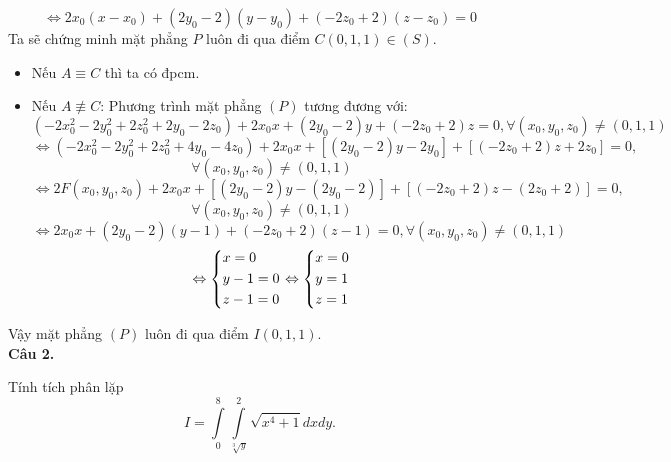 \documentclass[12pt,a4paper]{article}
\begin{document}
\begin{equation}
 \Leftrightarrow 2{x_0}\left( {x - {x_0}} \right) + \left( {2{y_0} - 2} \right)\left( {y - {y_0}} \right) + \left( { - 2{z_0} + 2} \right)\left( {z - {z_0}} \right) = 0
\end{equation} \label{ptmp}
Ta sẽ chứng minh mặt phẳng \(P\) luôn đi qua điểm \(C\left( {0,1,1} \right) \in \left( S \right).\) 
\begin{itemize}
\item Nếu \(A \equiv C\) thì ta có đpcm.
\item Nếu \(A \not \equiv C\):
Phương trình mặt phẳng \(\left( P \right)\) tương đương với:
\[\left( { - 2x_0^2 - 2y_0^2 + 2z_0^2 + 2{y_0} - 2{z_0}} \right) + 2{x_0}x + \left( {2{y_0} - 2} \right)y + \left( { - 2{z_0} + 2} \right)z = 0,\forall \left( {{x_0},{y_0},{z_0}} \right) \ne \left( {0,1,1} \right)\]
\[ \Leftrightarrow \left( { - 2x_0^2 - 2y_0^2 + 2z_0^2 + 4{y_0} - 4{z_0}} \right) + 2{x_0}x + \left[ {\left( {2{y_0} - 2} \right)y - 2{y_0}} \right] + \left[ {\left( { - 2{z_0} + 2} \right)z + 2{z_0}} \right] = 0,\]
\[\forall \left( {{x_0},{y_0},{z_0}} \right) \ne \left( {0,1,1} \right)\]
\[ \Leftrightarrow 2F\left( {{x_0},{y_0},{z_0}} \right) + 2{x_0}x + \left[ {\left( {2{y_0} - 2} \right)y - \left( {2{y_0} - 2} \right)} \right] + \left[ {\left( { - 2{z_0} + 2} \right)z - \left( {2{z_0} + 2} \right)} \right] = 0,\]
\[\forall \left( {{x_0},{y_0},{z_0}} \right) \ne \left( {0,1,1} \right)\]
\[ \Leftrightarrow 2{x_0}x + \left( {2{y_0} - 2} \right)\left( {y - 1} \right) + \left( { - 2{z_0} + 2} \right)\left( {z - 1} \right) = 0,\forall \left( {{x_0},{y_0},{z_0}} \right) \ne \left( {0,1,1} \right)\]
\[ \Leftrightarrow \left\{ \begin{gathered}
  x = 0 \hfill \\
  y - 1 = 0 \hfill \\
  z - 1 = 0 \hfill \\ 
\end{gathered}  \right. \Leftrightarrow \left\{ \begin{gathered}
  x = 0 \hfill \\
  y = 1 \hfill \\
  z = 1 \hfill \\ 
\end{gathered}  \right.\]
\end{itemize}
Vậy mặt phẳng \(\left( P \right)\) luôn đi qua điểm \(I\left( {0,1,1} \right).\)\\
\textbf{Câu 2.}
\begin{mybox}
Tính tích phân lặp \[I = \int\limits_0^8 {\int\limits_{\sqrt[3]{y}}^2 {\sqrt {{x^4} + 1} } dxdy.} \]
\end{mybox}
\end{document}
